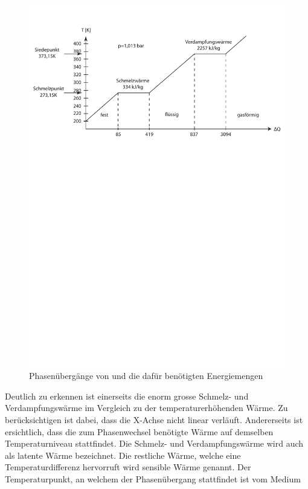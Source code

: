 \documentclass[11pt,a4paper]{scrartcl}
\begin{document}
\begin{figure}[h!]
\begin{center}
\includegraphics[scale=0.6]{images/Phasendiagramm.pdf}
\caption{Phasenübergänge von  und die dafür benötigten Energiemengen}
\label{fig:H2O}
\end{center}
\end{figure}
Deutlich zu erkennen ist einerseits die enorm grosse Schmelz- und
Verdampfungswärme im Vergleich zu der temperaturerhöhenden Wärme. Zu
berücksichtigen ist dabei, dass die X-Achse nicht linear verläuft. Andererseits
ist ersichtlich, dass die zum Phasenwechsel benötigte Wärme auf demselben
Temperaturniveau stattfindet. Die Schmelz- und Verdampfungswärme wird auch als
latente Wärme bezeichnet. Die restliche Wärme, welche eine Temperaturdifferenz
hervorruft wird sensible Wärme genannt.
Der Temperaturpunkt, an welchem der Phasenübergang stattfindet ist vom Medium
\end{document}
